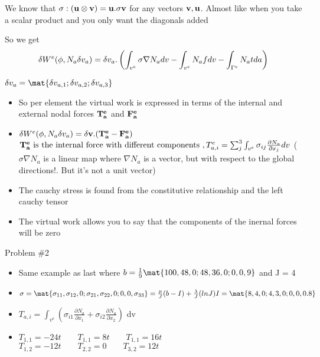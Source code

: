	\begin{frame}
		We know that $\mathbf{\sigma :(u \otimes v) = u. \sigma v}$ for any vectors $\mathbf{v,u}$. Almost like when you take a scalar product and you only want the diagonals added
		
		So we get 
		\begin{equation}
			\delta W^e(\phi,N_a\delta v_a) =  \delta v_a .\left(\int_{v^e} \mathbf{\sigma} \nabla N_a dv - \int_{v^e} N_af dv - \int_{\Gamma^e} N_a tda \right)
		\end{equation}
		
		$\delta v_a = \mat{\delta v_{a,1} ; \delta v_{a,2}; \delta v_{a,3}}$\\
		
		\begin{itemize}
			\item So per element the virtual work is expressed in terms of the internal and external nodal forces $\mathbf{T_a^e}$ and $\mathbf{F_a^e}$
			\item $ \delta W^e(\phi,N_a\delta v_a) = \mathbf{\delta v.(T_a^e-F_a^e)}$ \\
			$\mathbf{T_a^e} ~\text{is the internal force with different components }, T_{a,i}^e = \sum_{j}^{3} \int_{v^e} \sigma_{ij}\frac{\partial N_a}{\partial x_j} dv$ ($\sigma \nabla N_a$ is a linear map where $\nabla N_a$ is a vector, but with respect to the global directions!. But it's not a unit vector)	
			\item The cauchy stress is found from the constitutive relationship and the left cauchy tensor	
			\item The virtual work allows you to say that the components of the inernal forces will be zero
		\end{itemize}
	\end{frame}


	\begin{frame}{Problem \#2}
		\begin{itemize}
			\item Same example as last where $b = \frac{1}{9} \mat{100,48,0;48,36,0;0,0,9}$ and J = 4
			\item $\sigma =  \mat{\sigma_{11},\sigma_{12},0;\sigma_{21},\sigma_{22},0;
			0,0,\sigma_{33}} = \frac{\mu}{J}(b-I) + \frac{\lambda}{J}(lnJ)I = \mat{8,4,0;4,3,0;0,0,0.8}$
			\item $T_{a,i} = \int_{v^e} \left(\sigma_{i1} \frac{\partial N_a}{\partial x_1} + \sigma_{i2} \frac{\partial N_a}{\partial x_2} \right)$ dv \\
			\item $ T_{1,1} = -24t \qquad T_{1,1} = 8t \qquad T_{1,1} = 16t $ \\ 
				  $	T_{1,2} = -12t \qquad T_{2,2} = 0 \qquad T_{3,2} = 12t $	 		
		\end{itemize}
 	\end{frame}
 
